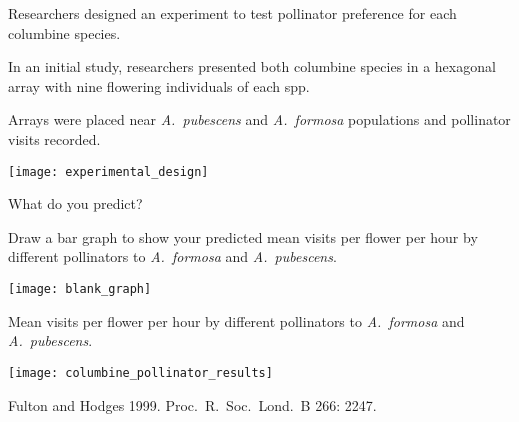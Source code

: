 \documentclass[t,handout]{beamer}  %
\begin{document}
%
\begin{frame}[t]{Researchers designed an experiment to test pollinator preference for each columbine species.}
	
	\begin{multicols}{2}
	\hangpara In an initial study, researchers presented both columbine species in a hexagonal array with nine flowering individuals of each spp. 
	
	\hangpara Arrays were placed near \textit{A.~pubescens} and \textit{A.~formosa} populations and pollinator visits recorded.
	
	\hangpara {}

	\columnbreak
	
		\texttt{[image: experimental\_design]}
	\end{multicols}

\end{frame}
%
\begin{frame}[t]{What do you predict?}
	
	\vspace*{-\baselineskip}
	
	\hangpara Draw a bar graph to show your predicted mean visits per flower per hour by different pollinators to \textit{A.~formosa} and \textit{A.~pubescens}.
	
	\bigskip
	
	{\centering
		\texttt{[image: blank\_graph]}\par
	}
	
\end{frame}
%
\begin{frame}[t]{Mean visits per flower per hour by different pollinators to \textit{A.~formosa} and \textit{A.~pubescens}.}

	{\centering
	\texttt{[image: columbine\_pollinator\_results]}\par
	}

	\vfilll
	
	\tiny Fulton and Hodges 1999. Proc.~R.~Soc.~Lond.~B 266: 2247.
\end{frame}
%
\end{document}

